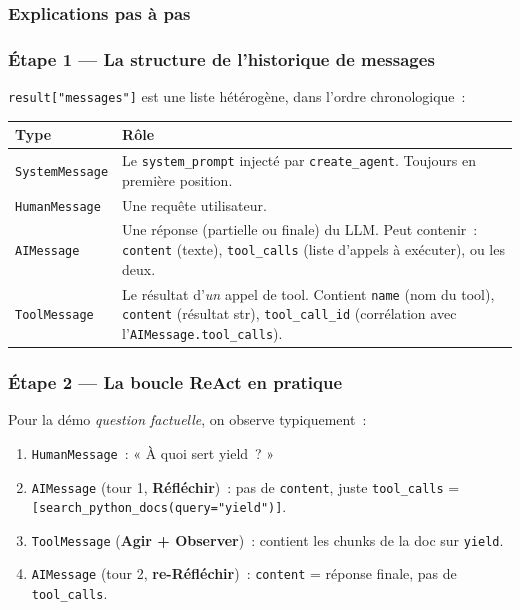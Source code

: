 \documentclass[11pt,a4paper]{article}
\begin{document}
\subsubsection{Explications pas à pas}

\subsubsection*{Étape 1 — La structure de l'historique de messages}

\texttt{result["messages"]} est une liste hétérogène, dans l'ordre
chronologique~:

\begin{center}
\begin{tabular}{p{3.5cm} p{11cm}}
\toprule
\textbf{Type} & \textbf{Rôle} \\
\midrule
\texttt{SystemMessage}
& Le \texttt{system\_prompt} injecté par \texttt{create\_agent}. Toujours
en première position. \\[1mm]
\texttt{HumanMessage}
& Une requête utilisateur. \\[1mm]
\texttt{AIMessage}
& Une réponse (partielle ou finale) du LLM. Peut contenir~:
\texttt{content} (texte), \texttt{tool\_calls} (liste d'appels à
exécuter), ou les deux. \\[1mm]
\texttt{ToolMessage}
& Le résultat d'\emph{un} appel de tool. Contient \texttt{name} (nom du
tool), \texttt{content} (résultat str), \texttt{tool\_call\_id}
(corrélation avec l'\texttt{AIMessage.tool\_calls}). \\
\bottomrule
\end{tabular}
\end{center}

\subsubsection*{Étape 2 — La boucle ReAct en pratique}

Pour la démo \emph{question factuelle}, on observe typiquement~:

\begin{enumerate}[leftmargin=*]
  \item \texttt{HumanMessage}~: « À quoi sert yield~? »
  \item \texttt{AIMessage} (tour 1, \textbf{Réfléchir})~: pas de
        \texttt{content}, juste \texttt{tool\_calls} =
        \texttt{[search\_python\_docs(query="yield")]}.
  \item \texttt{ToolMessage} (\textbf{Agir + Observer})~: contient les
        chunks de la doc sur \texttt{yield}.
  \item \texttt{AIMessage} (tour 2, \textbf{re-Réfléchir})~:
        \texttt{content} = réponse finale, pas de \texttt{tool\_calls}.
\end{enumerate}
\end{document}
